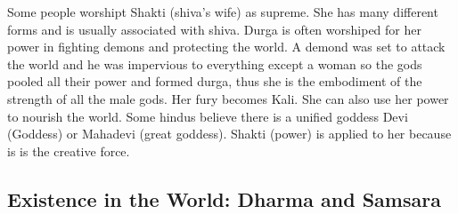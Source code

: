 \documentclass{article}
\begin{document}
Some people worshipt Shakti (shiva's wife) as supreme. She has many different forms and is usually associated with shiva. Durga is often worshiped for her power in fighting demons and protecting the world. A demond was set to attack the world and he was impervious to everything except a woman so the gods pooled all their power and formed durga, thus she is the embodiment of the strength of all the male gods. Her fury becomes Kali. She can also use her power to nourish the world. Some hindus believe there is a unified goddess Devi (Goddess) or Mahadevi (great goddess). Shakti (power) is applied to her because is is the creative force.


\subsection*{Existence in the World: Dharma and Samsara}
\label{sub:existence_in_the_world_dharma_and_samsara}
\end{document}
